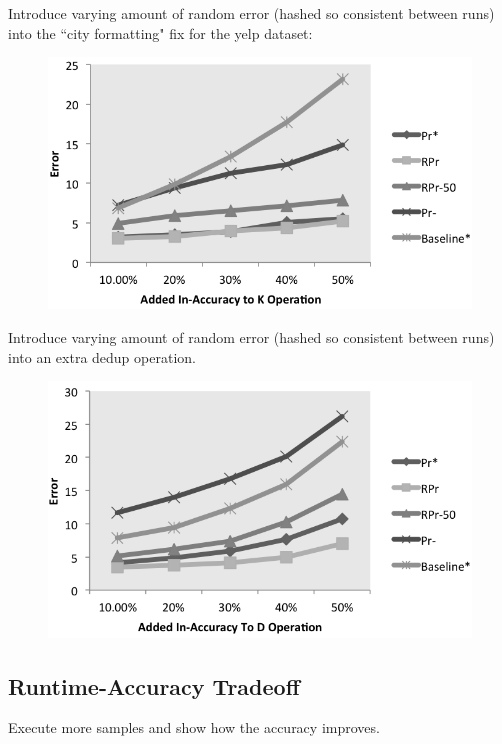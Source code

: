 Introduce varying amount of random error (hashed so consistent between runs) into the ``city formatting" fix for the yelp dataset:

\begin{figure}[ht]
\centering
\includegraphics[scale=0.5]{fig2.png}
\caption{}
\label{exp:ms-academic-ranking}
\end{figure}

Introduce varying amount of random error (hashed so consistent between runs) into an extra dedup operation.

\begin{figure}[ht]
\centering
\includegraphics[scale=0.5]{fig3.png}
\caption{}
\label{exp:ms-academic-ranking}
\end{figure}

\subsection{Runtime-Accuracy Tradeoff}
Execute more samples and show how the accuracy improves.

